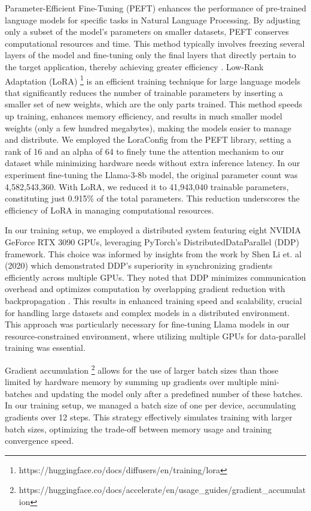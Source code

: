 \documentclass[logo,msc]{infthesis}           %
\begin{document}
Parameter-Efficient Fine-Tuning (PEFT) enhances the performance of pre-trained language models for specific tasks in Natural Language Processing. By adjusting only a subset of the model’s parameters on smaller datasets, PEFT conserves computational resources and time. This method typically involves freezing several layers of the model and fine-tuning only the final layers that directly pertain to the target application, thereby achieving greater efficiency \cite{j2024finetuningllmenterprise}. Low-Rank Adaptation (LoRA) \footnote{https://huggingface.co/docs/diffusers/en/training/lora} is an efficient training technique for large language models that significantly reduces the number of trainable parameters by inserting a smaller set of new weights, which are the only parts trained. This method speeds up training, enhances memory efficiency, and results in much smaller model weights (only a few hundred megabytes), making the models easier to manage and distribute. We employed the LoraConfig from the PEFT library, setting a rank of 16 and an alpha of 64 to finely tune the attention mechanism to our dataset while minimizing hardware needs without extra inference latency. In our experiment fine-tuning the Llama-3-8b model, the original parameter count was 4,582,543,360. With LoRA, we reduced it to 41,943,040 trainable parameters, constituting just 0.915\% of the total parameters. This reduction underscores the efficiency of LoRA in managing computational resources.


In our training setup, we employed a distributed system featuring eight NVIDIA GeForce RTX 3090 GPUs, leveraging PyTorch's DistributedDataParallel (DDP) framework. This choice was informed by insights from the work by Shen Li et. al (2020) which demonstrated DDP's superiority in synchronizing gradients efficiently across multiple GPUs. They noted that DDP minimizes communication overhead and optimizes computation by overlapping gradient reduction with backpropagation \cite{li2020pytorchdistributedexperiencesaccelerating}. This results in enhanced training speed and scalability, crucial for handling large datasets and complex models in a distributed environment. This approach was particularly necessary for fine-tuning Llama models in our resource-constrained environment, where utilizing multiple GPUs for data-parallel training was essential. 

Gradient accumulation \footnote{https://huggingface.co/docs/accelerate/en/usage\_guides/gradient\_accumulation} allows for the use of larger batch sizes than those limited by hardware memory by summing up gradients over multiple mini-batches and updating the model only after a predefined number of these batches. In our training setup, we managed a batch size of one per device, accumulating gradients over 12 steps. This strategy effectively simulates training with larger batch sizes, optimizing the trade-off between memory usage and training convergence speed.
\end{document}
